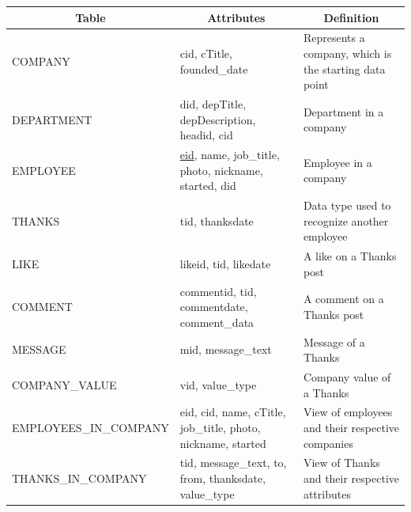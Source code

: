 \documentclass[11pt]{report}
\begin{document}
\begin{table}[h]
{\begin{tabular}{|p{5cm}|p{5cm}|p{5cm}|}
\hline
\multicolumn{1}{|c|}{\textbf{Table}} & \multicolumn{1}{c|}{\textbf{Attributes}}                            & \multicolumn{1}{c|}{\textbf{Definition}}               \\ \hline
COMPANY                              & cid, cTitle, founded\_date                                          & Represents a company, which is the starting data point \\ \hline
DEPARTMENT                           & did, depTitle, depDescription, headid, cid                          & Department in a company                                \\ \hline
EMPLOYEE                             & \underline{eid}, name, job\_title, photo, nickname, started, did    & Employee in a company                                  \\ \hline
THANKS                               & tid, thanksdate                                                     & Data type used to recognize another employee           \\ \hline
LIKE                                 & likeid, tid, likedate                                               & A like on a Thanks post                                \\ \hline
COMMENT                              & commentid, tid, commentdate, comment\_data                              & A comment on a Thanks post                             \\ \hline
MESSAGE                              & mid, message\_text                                                  & Message of a Thanks                                    \\ \hline
COMPANY\_VALUE                       & vid, value\_type                                                    & Company value of a Thanks                              \\ \hline
EMPLOYEES\_IN\_COMPANY               & eid, cid, name, cTitle, job\_title, photo, nickname, started                                                    & View of employees and their respective companies                              \\ \hline
THANKS\_IN\_COMPANY                  & tid, message\_text, to, from, thanksdate, value\_type                                                   & View of Thanks and their respective attributes                             \\ \hline
\end{tabular}
}
\end{table}
\clearpage
\end{document}
